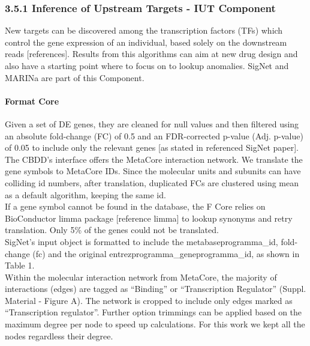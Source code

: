 \subsubsection{3.5.1 Inference of Upstream Targets - IUT Component}
New targets can be discovered among the transcription factors (TFs) which control the gene expression of an individual, based solely on the downstream reads [references]. Results from this algorithms can aim at new drug design and also have a starting point where to focus on to lookup anomalies. SigNet and MARINa are part of this Component.

\paragraph{Format Core}
Given a set of DE genes, they are cleaned for null values and then filtered using an absolute fold-change (FC) of 0.5 and an FDR-corrected p-value (Adj. p-value) of 0.05 to include only the relevant genes [as stated in referenced SigNet paper].
\\

The CBDD's interface offers the MetaCore interaction network. We translate the gene symbols to MetaCore IDs. Since the molecular units and subunits can have colliding id numbers, after translation, duplicated FCs are clustered using mean as a default algorithm, keeping the same id.
\\

If a gene symbol cannot be found in the database, the F Core relies on BioConductor limma package [reference limma] to lookup synonyms and retry translation. Only 5\% of the genes could not be translated.
\\

SigNet’s input object is formatted to include the metabaseprogramma\_id, fold-change (fc) and the original entrezprogramma\_geneprogramma\_id, as shown in Table 1.
\\

Within the molecular interaction network from MetaCore, the majority of interactions (edges) are tagged as “Binding” or “Transcription Regulator” (Suppl. Material - Figure A). The network is cropped to include only edges marked as “Transcription regulator”. Further option trimmings can be applied based on the maximum degree per node to speed up calculations. For this work we kept all the nodes regardless their degree.

